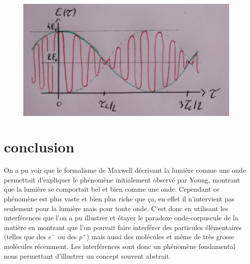 \documentclass[12pt,prb,aps,epsf]{report}
\begin{document}
\begin{figure}[h]
	\centerline{ \includegraphics[width=12cm]{doublet}}
\end{figure}

\section{conclusion}
On a pu voir que le formalisme de Maxwell décrivant la lumière comme une onde permettait d'expliquer le phénomène initialement observé par Young, montrant que la lumière se comportait bel et bien comme une onde. Cependant ce phénomène est plus vaste et bien plus riche que ça, en effet il n'intervient pas seulement pour la lumière mais pour toute onde. C'est donc en utilisant les interférences que l'on a pu illustrer et étayer le paradoxe onde-corpuscule de la matière en montrant que l'on pouvait faire interférer des particules élémentaires (telles que des $e^-$ ou des $p^+$) mais aussi des molécules et même de très grosse molécules récemment. Les interférences sont donc un phénomène fondamental nous permettant d'illustrer un concept souvent abstrait.
\end{document}
